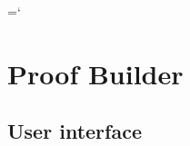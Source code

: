 
\def\bl{\mbox{}\newline\mbox{}\newline{}}
\newcommand{\hide}[2]{
\ifthenelse{\equal{#1}{inherited}}%
{}%
{}%
}
\newcommand{\entityintro}[3]{%
\hbox to \hsize{%
\vbox{%
\hbox to .2in{}%
}%
{\bf #1}%
\dotfill\pageref{#2}%
}
\makebox[\hsize]{%
\parbox{.4in}{}%
\parbox[l]{5in}{%
\vspace{1mm}\it%
#3%
\vspace{1mm}%
}%
}%
}
\newcommand{\isep}[0]{%
\setlength{\itemsep}{-.4ex}
}
\newcommand{\sld}[0]{%
\setlength{\topsep}{0em}
\setlength{\partopsep}{0em}
\setlength{\parskip}{0em}
\setlength{\parsep}{-1em}
}
\newcommand{\headref}[3]{%
\ifthenelse{#1 = 1}{%
\addcontentsline{toc}{section}{\hspace{\qquad}\protect\numberline{}{#3}}%
}{}%
\ifthenelse{#1 = 2}{%
\addcontentsline{toc}{subsection}{\hspace{\qquad}\protect\numerline{}{#3}}%
}{}%
\ifthenelse{#1 = 3}{%
\addcontentsline{toc}{subsubsection}{\hspace{\qquad}\protect\numerline{}{#3}}%
}{}%
\label{#3}%
\makebox[\textwidth][l]{#2 #3}%
}%
\newcommand{\membername}[1]{{\it #1}\linebreak}
\newcommand{\divideents}[1]{\vskip -1em\indent\rule{2in}{.5mm}}
\newcommand{\refdefined}[1]{
\expandafter\ifx\csname r@#1\endcsname\relax
\relax\else
{$($ in \ref{#1}, page \pageref{#1}$)$}
\fi}
\newcommand{\startsection}[4]{
\gdef\classname{#2}
\subsection{\label{#3}{\bf {\sc #1} #2}}{
\rule[1em]{\hsize}{4pt}\vskip -1em
\vskip .1in 
#4
}%
}
\newcommand{\startsubsubsection}[2]{
\subsubsection{\sc #1}{%
\rule[1em]{\hsize}{2pt}%
#2}
}
\date{\today}
\pagestyle{myheadings}
\oddsidemargin 0in
\evensidemargin 0in
\chardef\bslash=`\\
\textheight 9.4in

\chapter{Proof Builder}

\section{User interface}

